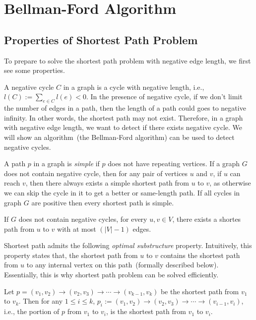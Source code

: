 \section{Bellman-Ford Algorithm}

\subsection*{Properties of Shortest Path Problem}

To prepare to solve the shortest path problem with negative edge length, we first see some properties.

A negative cycle $C$ in a graph is a cycle with negative length, i.e., $l(C) := \sum_{e\in C} l(e) < 0$.
In the presence of negative cycle, if we don't limit the number of edges
in a path, then the length of a path could goes to negative infinity.
In other words, the shortest path may not exist.
Therefore, in a graph with negative edge length, we want to
detect if there exists negative cycle.
We will show an algorithm~(the Bellman-Ford algorithm) can be used to detect negative cycles.

A path $p$ in a graph is \emph{simple} if $p$ does not have repeating vertices.
If a graph $G$ does not contain negative cycle, then 
for any pair of vertices $u$ and $v$, if $u$ can reach $v$,
then there always exists a {simple} shortest path from $u$ to $v$,
as otherwise we can skip the cycle in it to get a better or same-length path.
If all cycles in graph $G$ are positive then every shortest path is simple.

\begin{property}
If $G$ does not contain negative cycles, for every $u,v\in V$, there exists a shortes path
from $u$ to $v$ with at most $(|V| - 1)$ edges.
\end{property}

Shortest path admits the following \emph{optimal substructure} property.
Intuitively, this property states that, the shortest path from $u$ to $v$
contains the shortest path from $u$ to any internal vertex on this path~(formally described below).
Essentially, this is why shortest path problem can be solved efficiently.

\begin{property}
Let $p = (v_1, v_2) \to (v_2, v_3) \to \cdots \to (v_{k-1}, v_k)$
be the shortest path from $v_1$ to $v_k$.
Then for any $1\le i \le k$,
$p_i := (v_1, v_2) \to (v_2, v_3) \to \cdots \to (v_{i-1}, v_i)$, i.e., the portion of $p$ from $v_1$ to $v_i$,
is the shortest path from $v_1$ to $v_i$.
\end{property}

